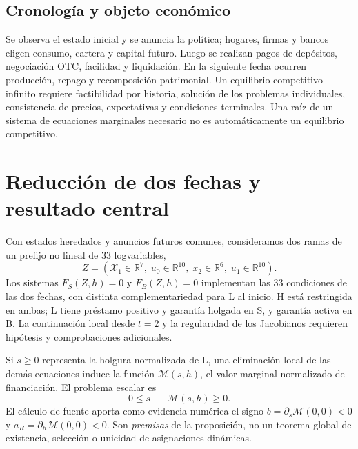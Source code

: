 \subsection{Cronología y objeto económico}
Se observa el estado inicial y se anuncia la política; hogares,
firmas y bancos eligen consumo, cartera y capital futuro. Luego se
realizan pagos de depósitos, negociación OTC, facilidad y liquidación.
En la siguiente fecha ocurren producción, repago y recomposición
patrimonial. Un equilibrio competitivo infinito requiere factibilidad
por historia, solución de los problemas individuales,
consistencia de precios, expectativas y condiciones terminales.
Una raíz de un sistema de ecuaciones marginales necesario no es
automáticamente un equilibrio competitivo.

\section{Reducción de dos fechas y resultado central}
\label{sec:compact_scalar}
Con estados heredados y anuncios futuros comunes, consideramos dos
ramas de un prefijo no lineal de 33 logvariables,
\[
 Z=\left(\mathcal X_1\in\mathbb R^7,\;
u_0\in\mathbb R^{10},\;
x_2\in\mathbb R^6,\;
u_1\in\mathbb R^{10}\right).
\]
Los sistemas \(F_S(Z,h)=0\) y \(F_B(Z,h)=0\) implementan las 33
condiciones de las dos fechas, con distinta complementariedad
para L al inicio. H está restringida en ambas; L tiene préstamo
positivo y garantía holgada en S, y garantía activa en B. La
continuación local desde \(t=2\) y la regularidad de los
Jacobianos requieren hipótesis y comprobaciones adicionales.

Si \(s\geq0\) representa la holgura normalizada de L, una
eliminación local de las demás ecuaciones induce la función
\(\mathcal M(s,h)\), el valor marginal normalizado de financiación.
El problema escalar es
\begin{equation}\label{eq:compact_complementarity}
0\leq s\ \perp\ \mathcal M(s,h)\geq0.
\end{equation}
El cálculo de fuente aporta como evidencia numérica el signo
\(b=\partial_s\mathcal M(0,0)<0\) y
\(a_R=\partial_h\mathcal M(0,0)<0\).
Son \emph{premisas} de la proposición, no un teorema global de
existencia, selección o unicidad de asignaciones dinámicas.
